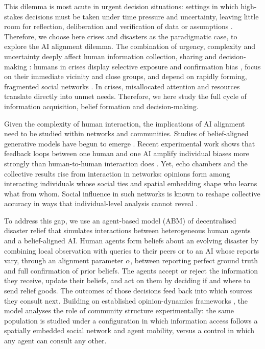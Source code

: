 \documentclass[pdflatex,sn-basic]{sn-jnl}
\begin{document}
This dilemma is most acute in urgent decision situations: settings in which high-stakes decisions must be taken under time pressure and uncertainty, leaving little room for reflection, deliberation and verification of data or assumptions \citep{svenson1993, mendonca2001, comes2020coordination}. Therefore, we choose here crises and
disasters as the paradigmatic case, to explore the AI alignment dilemma. The combination of urgency, complexity and uncertainty deeply affect human information collection, sharing and decision-making \citep{comes2024ai}: humans in crises display selective exposure \citep{barbera2015} and confirmation bias \citep{paulus2024}, focus on their immediate vicinity and close groups, and depend on rapidly forming, fragmented social networks \citep{holguinveras2012, comes2020coordination}. In crises, misallocated attention and resources translate directly into unmet needs. Therefore, we here study the full cycle of information acquisition, belief formation and decision-making. 
 
Given the complexity of human interaction, the implications of AI alignment need to be studied within networks and communities. Studies of belief-aligned generative models have begun to emerge \citep{sharma2024b, zhang2024, cheng2026sycophantic}. Recent experimental work shows that feedback loops between one human and one AI amplify individual biases more strongly than human-to-human interaction does
\citep{glickman2024human}. Yet, echo chambers and the collective results rise from interaction in networks: opinions form among interacting individuals whose social ties and spatial embedding shape who learns what from whom. Social influence in such networks is known to reshape collective accuracy in ways that individual-level analysis cannot reveal
\citep{lorenz2011social, becker2017network}. 
 
To address this gap, we use an agent-based model (ABM) of decentralised disaster relief that simulates interactions between heterogeneous human agents and a belief-aligned AI. Human agents form beliefs about an evolving disaster by combining local observation with queries to their peers or to an AI whose reports vary, through an alignment
parameter $\alpha$, between reporting perfect ground truth and full confirmation of prior beliefs. The agents accept or reject the
information they receive, update their beliefs, and act on them by deciding if and where to send relief goods. The outcomes of those
decisions feed back into which sources they consult next. Building on established opinion-dynamics frameworks \citep{deffuant2000,
hegselmann2002}, the model analyses the role of community structure experimentally: the same population is studied under a configuration in
which information access follows a spatially embedded social network and agent mobility, versus a control in which any agent can consult any other.
\end{document}
